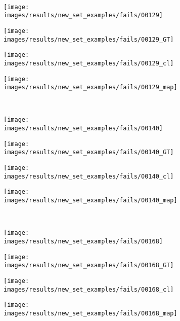 \begin{figure}[t]
\begin{subfigure}[c]{0.24\textwidth}
 \end{subfigure}
 \\
 \begin{subfigure}[c]{0.24\textwidth}
  \centering
  \texttt{[image: images/results/new\_set\_examples/fails/00129]}
 \end{subfigure}
 \begin{subfigure}[c]{0.24\textwidth}
  \centering
  \texttt{[image: images/results/new\_set\_examples/fails/00129\_GT]}
 \end{subfigure}
 \begin{subfigure}[c]{0.24\textwidth}
  \centering
  \texttt{[image: images/results/new\_set\_examples/fails/00129\_cl]}
 \end{subfigure}
 \begin{subfigure}[c]{0.24\textwidth}
  \centering
  \texttt{[image: images/results/new\_set\_examples/fails/00129\_map]}
 \end{subfigure}
 \\
 \begin{subfigure}[c]{0.24\textwidth}
  \centering
  \texttt{[image: images/results/new\_set\_examples/fails/00140]}
 \end{subfigure}
 \begin{subfigure}[c]{0.24\textwidth}
  \centering
  \texttt{[image: images/results/new\_set\_examples/fails/00140\_GT]}
 \end{subfigure}
 \begin{subfigure}[c]{0.24\textwidth}
  \centering
  \texttt{[image: images/results/new\_set\_examples/fails/00140\_cl]}
 \end{subfigure}
 \begin{subfigure}[c]{0.24\textwidth}
  \centering
  \texttt{[image: images/results/new\_set\_examples/fails/00140\_map]}
 \end{subfigure}
 \\
 \begin{subfigure}[c]{0.24\textwidth}
  \centering
  \texttt{[image: images/results/new\_set\_examples/fails/00168]}
 \end{subfigure}
 \begin{subfigure}[c]{0.24\textwidth}
  \centering
  \texttt{[image: images/results/new\_set\_examples/fails/00168\_GT]}
 \end{subfigure}
 \begin{subfigure}[c]{0.24\textwidth}
  \centering
  \texttt{[image: images/results/new\_set\_examples/fails/00168\_cl]}
 \end{subfigure}
 \begin{subfigure}[c]{0.24\textwidth}
  \centering
  \texttt{[image: images/results/new\_set\_examples/fails/00168\_map]}
 \end{subfigure}


\end{figure}
